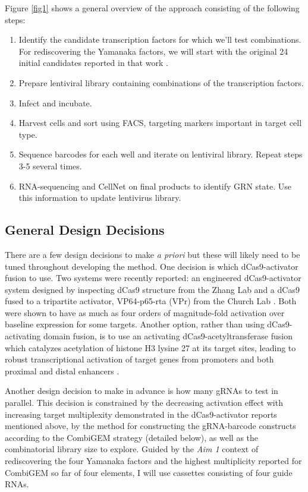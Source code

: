 \documentclass[10pt]{article}
\begin{document}
Figure \ref{fig1} shows a general overview of the approach consisting of the following steps:
\begin{enumerate}
    \setlength{\itemsep}{0pt}
    \item{Identify the candidate transcription factors for which we'll test combinations. For rediscovering the Yamanaka factors, we will start with the original 24 initial candidates reported in that work \cite{takahashi2006induction}.}
    \item{Prepare lentiviral library containing combinations of the transcription factors.}
    \item{Infect and incubate.}
    \item{Harvest cells and sort using FACS, targeting markers important in target cell type.}
    \item{Sequence barcodes for each well and iterate on lentiviral library. Repeat steps 3-5 several times.}
    \item{RNA-sequencing and CellNet on final products to identify GRN state. Use this information to update lentivirus library.}
\end{enumerate}

\subsection{General Design Decisions}

There are a few design decisions to make \textit{a priori} but these will likely need to be tuned throughout developing the method. One decision is which dCas9-activator fusion to use. Two systems were recently reported: an engineered dCas9-activator system designed by inspecting dCas9 structure from the Zhang Lab \cite{konermann2014genome} and a dCas9 fused to a tripartite activator, VP64-p65-rta (VPr) from the Church Lab \cite{chavez2015VPR}. Both were shown to have as much as four orders of magnitude-fold activation over baseline expression for some targets. Another option, rather than using dCas9-activating domain fusion, is to use an activating dCas9-acetyltransferase fusion which catalyzes acetylation of histone H3 lysine 27 at its target sites, leading to robust transcriptional activation of target genes from promoters and both proximal and distal enhancers \cite{hilton2015epigenome}.

Another design decision to make in advance is how many gRNAs to test in parallel. This decision is constrained by the decreasing activation effect with increasing target multiplexity demonstrated in the dCas9-activator reports mentioned above, by the method for constructing the gRNA-barcode constructs according to the CombiGEM \cite{cheng2014enhanced} strategy (detailed below), as well as the combinatorial library size to explore. Guided by the \textit{Aim 1} context of rediscovering the four Yamanaka factors and the highest multiplicity reported for CombiGEM so far of four elements, I will use cassettes consisting of four guide RNAs.
\end{document}
